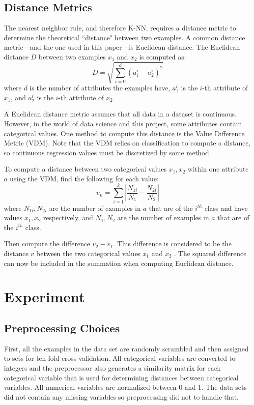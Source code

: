 \documentclass[twoside,11pt]{article}
\begin{document}
\subsection{Distance Metrics}

The nearest neighbor rule, and therefore K-NN, requires a distance metric to determine the theoretical ``distance" between two examples. A common distance metric---and the one used in this paper---is Euclidean distance. The Euclidean distance $D$ between two examples $x_1$ and $x_2$ is computed as:
$$D = \sqrt{\sum_{i=0}^{d}(a_1^i - a_2^i)^2}$$
where $d$ is the number of attributes the examples have, $a_1^i$ is the $i$-th attribute of $x_1$, and $a_2^i$ is the $i$-th attribute of $x_2$.

A Euclidean distance metric assumes that all data in a dataset is continuous. However, in the world of data science and this project, some attributes contain categorical values. One method to compute this distance is the Value Difference Metric (VDM). Note that the VDM relies on classification to compute a distance, so continuous regression values must be discretized by some method.

To compute a distance between two categorical values $x_1, x_2$ within one attribute $a$ using the VDM, find the following for each value:
$$ v_n = \sum _{i = 1}^{k} | \dfrac{N_{1i}}{N_1} - \dfrac{N_{2i}}{N_2} | $$
where $N_{1i}, N_{2i}$ are the number of examples in $a$ that are of the $i^{th}$ class and have values $x_1, x_2$ respectively, and $N_1, N_2$ are the number of examples in $a$ that are of the $i^{th}$ class.

Then compute the difference
$v_2 - v_1$.
This difference is considered to be the distance $v$ between the two categorical values $x_1$ and $x_2$ \citep{vdm}. The squared difference can now be included in the summation when computing Euclidean distance.

\section{Experiment}

\subsection{Preprocessing Choices}
First, all the examples in the data set are randomly scrambled and then assigned to sets
for ten-fold cross validation. All categorical variables are converted to integers and the
preprocessor also generates a similarity matrix for each categorical variable that is used for
determining distances between categorical variables. All numerical variables are normalized
between 0 and 1. The data sets did not contain any missing variables so preprocessing did
not to handle that.
\end{document}

